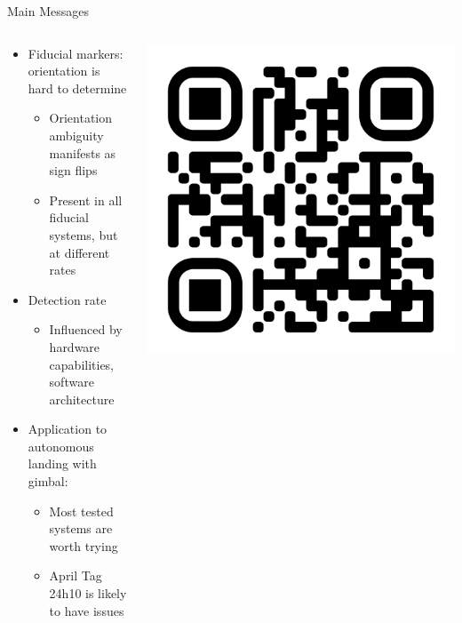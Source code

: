 \documentclass[aspectratio=169]{beamer}
\begin{document}
\begin{frame}{Main Messages}
	\begin{columns}
	\begin{column}{0.75\textwidth}
	\begin{itemize}
		\item Fiducial markers: orientation is hard to determine
		\begin{itemize}
			\item Orientation ambiguity manifests as sign flips
			\item Present in all fiducial systems, but at different rates
		\end{itemize}
		\item Detection rate
		\begin{itemize}
			\item Influenced by hardware capabilities, software architecture
		\end{itemize}
		\item Application to autonomous landing with gimbal:
		\begin{itemize}
			\item Most tested systems are worth trying
			\item April Tag 24h10 is likely to have issues
		\end{itemize}
	\end{itemize}
	\end{column}
	\begin{column}{0.24\textwidth}
		\centering
		\includegraphics[width=\textwidth]{./images/qr_uzgit_github_io.png}
	\end{column}
	\end{columns}
\end{frame}

%	
%	
\end{document}
